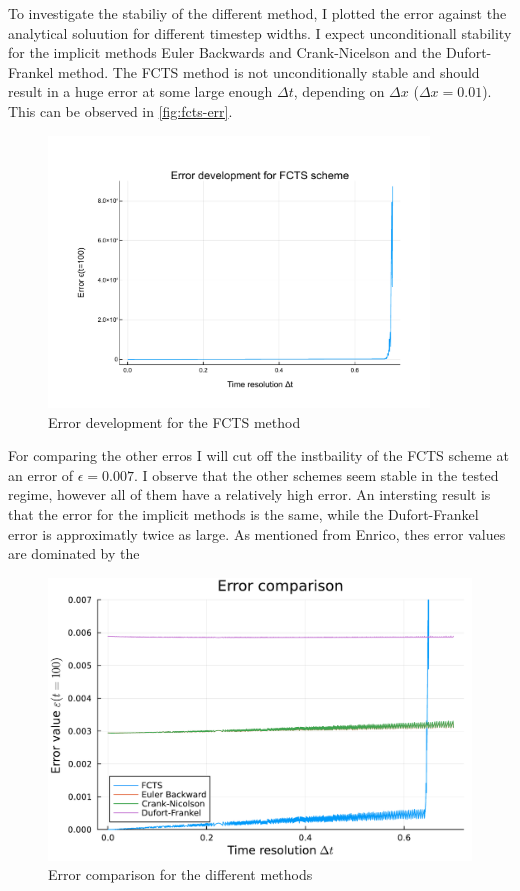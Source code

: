 \documentclass[
	a4paper, %
	10pt, %
]{CSUniSchoolLabReport}
\begin{document}
To investigate the stabiliy of the different method, I plotted the error against the analytical soluution for different timestep widths. I expect unconditionall stability for the implicit methods Euler Backwards and Crank-Nicelson and the Dufort-Frankel method. The FCTS method is not unconditionally stable and should result in a huge error at some large enough $\Delta t$, depending on $\Delta x$ ($\Delta x = 0.01$). This can be observed in \autoref{fig:fcts-err}.

\begin{figure}[H]
	\centering
	\includegraphics[width=0.9\textwidth]{../saves_t2/error_development_fcts.pdf}
	\caption{Error development for the FCTS method}
	\label{fig:fcts-err}
\end{figure}


For comparing the other erros I will cut off the instbaility of the FCTS scheme at an error of $\epsilon = 0.007$. I observe that the other schemes seem stable in the tested regime, however all of them have a relatively high error. An intersting result is that the error for the implicit methods is the same, while  the Dufort-Frankel error is approximatly twice as large. As mentioned from Enrico, thes error values are dominated by the 

\begin{figure}[H]
	\centering
	\includegraphics[width=\textwidth]{../saves_t2/error_comp_diffusion.pdf}
	\caption{Error comparison for the different methods}
\end{figure}
\end{document}
